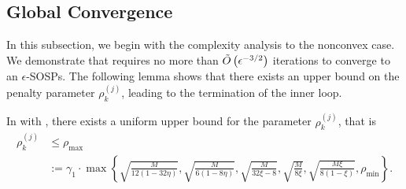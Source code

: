 \subsection{Global Convergence}
In this subsection, we begin with the complexity analysis to the nonconvex case. We demonstrate that  requires no more than $\Tilde{O}\left(\epsilon^{-3/2}\right)$ iterations to converge to an $\epsilon$-SOSPs.
The following lemma shows that there exists an upper bound on the penalty parameter $\rho_k^{(j)}$, leading to the termination of the inner loop.

\begin{lemma}
    \label{lem.upperbound sigma}
    In  with , there exists a uniform upper bound for the parameter $\rho_k^{(j)}$, that is
    \begin{equation}
        \label{eq.upperbound sigma}
        \begin{aligned}
        \rho_k^{(j)} &\leq \rho_{\max}\\
        &:=\gamma_1  \cdot \max \left \{\sqrt{\frac{M}{12(1-32\eta)}},\sqrt{\frac{M}{6(1-8\eta)}},\sqrt{\frac{M}{32\xi-8}},\sqrt{\frac{M}{8\xi}},\sqrt{\frac{M\xi}{8(1-\xi)}}, \rho_{\min}\right \}.
        \end{aligned}
    \end{equation}
\end{lemma}
